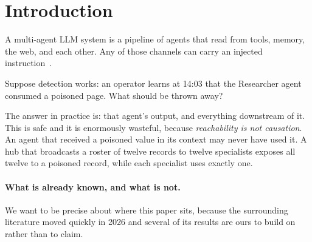 \documentclass[10pt,twocolumn]{article}
\newcommand{\sys}{\textsc{CausalLine}}
\begin{document}
\begin{abstract}
We are equally explicit about what this costs. \sys{} is \emph{more expensive
in tokens than every baseline we compare against}, including full restart:
$1.6\times$--$2.4\times$ the cost of simply re-running the workflow. We
therefore do not claim it is an optimization. We give the exact condition
under which it is the right choice---when completed work cannot be
re-executed, because it has side effects, external cost, or a non-deterministic
outcome that a restart may not reproduce---and we recommend restart when it
can. We further report two negative results that shaped the work: the
falsification of our own ex-ante economic gate, and a provenance defect whose
correction removed an apparent $+17.2$ point performance win that was, in
fact, a safety failure.

\textbf{Scope of the claim.} We claim neither the exposure/influence
distinction nor counterfactual attribution as contributions; both are prior
work. What we claim is the specific combination---detector-triggered recovery,
three-relation propagation, byte-exact splicing, and verification with
escalation---together with its evaluation at a scale and heterogeneity the
recovery literature has not yet used, and an economic characterisation that
tells a practitioner when \emph{not} to use it.
\end{abstract}

\section{Introduction}

A multi-agent LLM system is a pipeline of agents that read from tools, memory,
the web, and each other. Any of those channels can carry an injected
instruction~\cite{greshake2023,perez2022,liu2024}.

Suppose detection works: an operator learns at 14:03 that the Researcher agent
consumed a poisoned page. What should be thrown away?

The answer in practice is: that agent's output, and everything downstream of
it. This is safe and it is enormously wasteful, because \emph{reachability is
not causation}. An agent that received a poisoned value in its context may
never have used it. A hub that broadcasts a roster of twelve records to twelve
specialists exposes all twelve to a poisoned record, while each specialist
uses exactly one.

\paragraph{What is already known, and what is not.}
We want to be precise about where this paper sits, because the surrounding
literature moved quickly in 2026 and several of its results are ours to build
on rather than to claim.
\end{document}

